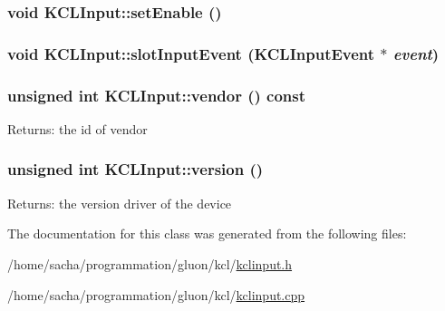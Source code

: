 \hypertarget{class_k_c_l_input_7b6f5e42d88e677d371e615fa686e79e}{
\subsubsection[{setEnable}]{\setlength{\rightskip}{0pt plus 5cm}void KCLInput::setEnable ()}}
\label{class_k_c_l_input_7b6f5e42d88e677d371e615fa686e79e}


\hypertarget{class_k_c_l_input_09e6f283721d38bb9aa2a703d6a735c6}{
\subsubsection[{slotInputEvent}]{\setlength{\rightskip}{0pt plus 5cm}void KCLInput::slotInputEvent ({\bf KCLInputEvent} $\ast$ {\em event})}}
\label{class_k_c_l_input_09e6f283721d38bb9aa2a703d6a735c6}


\hypertarget{class_k_c_l_input_5919b85a4f70f9d573dfea5b797fbe85}{
\subsubsection[{vendor}]{\setlength{\rightskip}{0pt plus 5cm}unsigned int KCLInput::vendor () const}}
\label{class_k_c_l_input_5919b85a4f70f9d573dfea5b797fbe85}


\begin{Desc}
\item[Returns:]the id of vendor \end{Desc}
\hypertarget{class_k_c_l_input_53ebfb56b5039bdeb8b6bed4bbff1b0e}{
\subsubsection[{version}]{\setlength{\rightskip}{0pt plus 5cm}unsigned int KCLInput::version ()}}
\label{class_k_c_l_input_53ebfb56b5039bdeb8b6bed4bbff1b0e}


\begin{Desc}
\item[Returns:]the version driver of the device \end{Desc}


The documentation for this class was generated from the following files:\begin{CompactItemize}
\item 
/home/sacha/programmation/gluon/kcl/\hyperlink{kclinput_8h}{kclinput.h}\item 
/home/sacha/programmation/gluon/kcl/\hyperlink{kclinput_8cpp}{kclinput.cpp}\end{CompactItemize}
